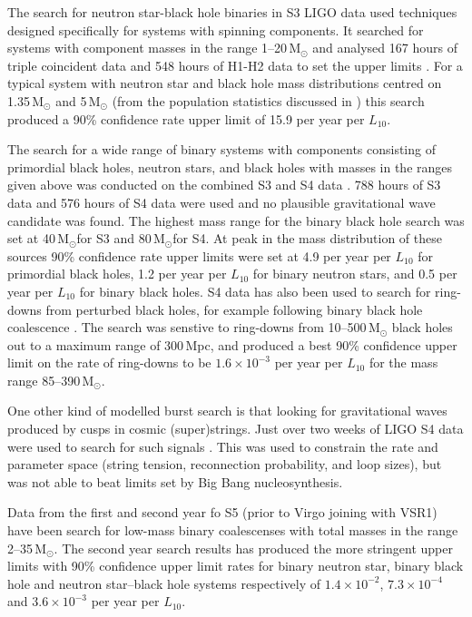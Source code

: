 \documentclass{article}
\newcommand{\Msun}{\,M$_{\odot}$}
\begin{document}
The search for neutron star-black hole binaries in S3 LIGO data used techniques
designed specifically for systems with spinning components. It searched for
systems with component masses in the range 1--20\,M$_{\odot}$ and analysed 167
hours of triple coincident data and 548 hours of H1-H2 data to set the upper
limits \cite{Abbott:2008d}. For a typical system with neutron star and black
hole mass distributions centred on 1.35\,M$_{\odot}$ and 5\,M$_{\odot}$ (from
the population statistics discussed in \cite{Abbott:2008a}) this search produced
a 90\% confidence rate upper limit of 15.9 per year per $L_{10}$.

The search for a wide range of binary systems with components consisting of
primordial black holes, neutron stars, and black holes with masses in
the ranges given above was conducted on the combined S3 and S4 data
\cite{Abbott:2008a}. 788 hours of S3 data and 576 hours of S4 data were used
and no plausible gravitational wave candidate was found. The highest mass range
for the binary black hole search was set at 40\Msun for S3 and 80\Msun for S4.
At peak in the mass distribution of these sources 90\% confidence rate upper
limits were set at 4.9 per year per $L_{10}$ for primordial black holes, 1.2 per
year per $L_{10}$ for binary neutron stars, and 0.5 per year per $L_{10}$ for
binary black holes. S4 data has also been used to search for ring-downs from
perturbed black holes, for example following binary black hole coalescence
\cite{Abbott:2009g}. The search was senstive to ring-downs from
10--500\,M$_{\odot}$ black holes out to a maximum range of 300\,Mpc, and
produced a best 90\% confidence upper limit on the rate of ring-downs to be
$1.6\times10^{-3}$ per year per $L_{10}$ for the mass range
85--390\,M$_{\odot}$.

One other kind of modelled burst search is that looking for gravitational waves
produced by cusps in cosmic (super)strings. Just over two weeks of LIGO S4 data
were used to search for such signals \cite{Abbott:2009j}. This was used to
constrain the rate and parameter space (string tension, reconnection
probability, and loop sizes), but was not able to beat limits set by Big Bang
nucleosynthesis.

Data from the first \cite{Abbott:2009e} and second year fo S5 (prior to Virgo
joining with VSR1) \cite{Abbott:2009f} have been search for low-mass binary
coalescenses with total masses in the range 2--35\,M$_{\odot}$. The second
year search results has produced the more stringent upper limits with 90\%
confidence upper limit rates for binary neutron star, binary black hole and
neutron star--black hole systems respectively of $1.4\times10^{-2}$,
$7.3\times10^{-4}$ and $3.6\times10^{-3}$ per year per $L_{10}$.
\end{document}
